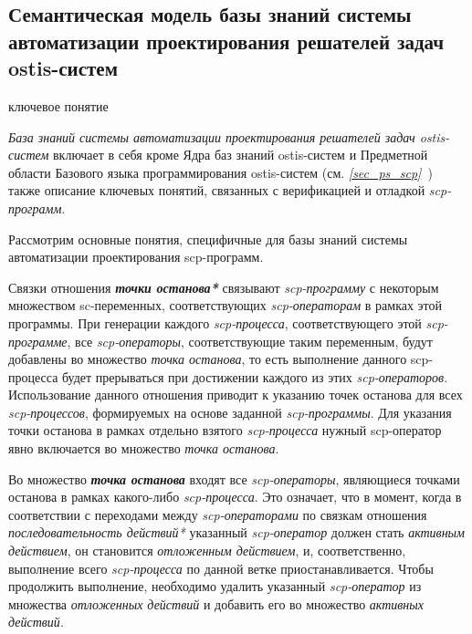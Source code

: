 \subsection{Семантическая модель базы знаний системы автоматизации проектирования решателей задач ostis-систем}
\begin{SCn}
\bigskip

\begin{scnrelfromlist}{ключевое понятие}
\end{scnrelfromlist}
\end{SCn}
\label{sub_sec_kb_ps_des_auto_sys}
\textit{База знаний системы автоматизации проектирования решателей задач ostis-систем} включает в себя кроме Ядра баз знаний ostis-систем и Предметной области Базового языка программирования ostis-систем (см. \textit{\ref{sec_ps_scp}~}) также описание ключевых понятий, связанных с верификацией и отладкой \textit{scp-программ}.

Рассмотрим основные понятия, специфичные для базы знаний системы автоматизации проектирования scp-программ.

Связки отношения \textbf{\textit{точки останова*}} связывают \textit{scp-программу} с некоторым множеством sc-переменных, соответствующих \textit{scp-операторам} в рамках этой программы. При генерации каждого \textit{scp-процесса}, соответствующего этой \textit{scp-программе}, все \textit{scp-операторы}, соответствующие таким переменным, будут добавлены во множество \textit{точка останова}, то есть выполнение данного scp-процесса будет прерываться при достижении каждого из этих \textit{scp-операторов}.
Использование данного отношения приводит к указанию точек останова для всех \textit{scp-процессов}, формируемых на основе заданной \textit{\mbox{scp-программы}}. Для указания точки останова в рамках отдельно взятого \textit{scp-процесса} нужный scp-оператор явно включается во множество \textit{точка останова}.

\begin{SCn}
\end{SCn}

Во множество \textbf{\textit{точка останова}} входят все \textit{scp-операторы}, являющиеся точками останова в рамках какого-либо \textit{scp-процесса}. Это означает, что в момент, когда в соответствии с переходами между \textit{scp-операторами} по связкам отношения \textit{последовательность действий*} указанный \textit{scp-оператор} должен стать \textit{активным действием}, он становится \textit{отложенным действием}, и, соответственно, выполнение всего \textit{scp-процесса} по данной ветке приостанавливается. Чтобы продолжить выполнение, необходимо удалить указанный \textit{\mbox{scp-оператор}} из множества \textit{отложенных действий} и добавить его во множество \textit{активных действий}.

